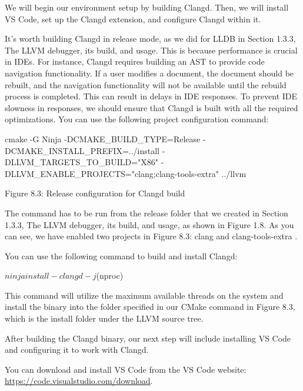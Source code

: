 We will begin our environment setup by building Clangd. Then, we will install VS Code, set up the Clangd extension, and configure Clangd within it.


It’s worth building Clangd in release mode, as we did for LLDB in Section 1.3.3, The LLVM debugger, its build, and usage. This is because performance is crucial in IDEs. For instance, Clangd requires building an AST to provide code navigation functionality. If a user modifies a document, the document should be rebuilt, and the navigation functionality will not be available until the rebuild process is completed. This can result in delays in IDE responses. To prevent IDE slowness in responses, we should ensure that Clangd is built with all the required optimizations. You can use the following project configuration command:

\begin{shell}
cmake -G Ninja -DCMAKE_BUILD_TYPE=Release -DCMAKE_INSTALL_PREFIX=../install -DLLVM_TARGETS_TO_BUILD="X86" -DLLVM_ENABLE_PROJECTS="clang;clang-tools-extra" ../llvm
\end{shell}

\begin{center}
Figure 8.3: Release configuration for Clangd build
\end{center}

The command has to be run from the release folder that we created in Section 1.3.3, The LLVM debugger, its build, and usage, as shown in Figure 1.8. As you can see, we have enabled two projects in Figure 8.3: clang and clang-tools-extra .

You can use the following command to build and install Clangd:

\begin{shell}
$ ninja install-clangd -j $(nproc)
\end{shell}

This command will utilize the maximum available threads on the system and install the binary into the folder specified in our CMake command in Figure 8.3, which is the install folder under the LLVM source tree.

After building the Clangd binary, our next step will include installing VS Code and configuring it to work with Clangd.


You can download and install VS Code from the VS Code website: \url{https://code.visualstudio.com/download}.

